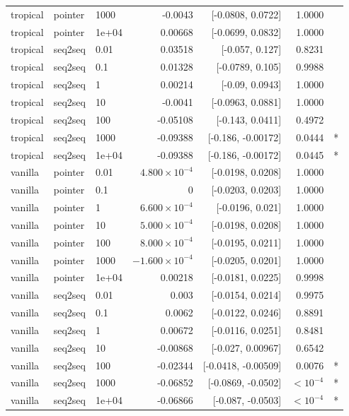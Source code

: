 \documentclass[10pt]{article}
\begin{document}
{\begin{longtable}{lllrrrl}
tropical & pointer & 1000 & -0.0043 & [-0.0808, 0.0722] & 1.0000 & \\
tropical & pointer & 1e+04 & 0.00668 & [-0.0699, 0.0832] & 1.0000 & \\
tropical & seq2seq & 0.01 & 0.03518 & [-0.057, 0.127] & 0.8231 & \\
tropical & seq2seq & 0.1 & 0.01328 & [-0.0789, 0.105] & 0.9988 & \\
tropical & seq2seq & 1 & 0.00214 & [-0.09, 0.0943] & 1.0000 & \\
tropical & seq2seq & 10 & -0.0041 & [-0.0963, 0.0881] & 1.0000 & \\
tropical & seq2seq & 100 & -0.05108 & [-0.143, 0.0411] & 0.4972 & \\
tropical & seq2seq & 1000 & -0.09388 & [-0.186, -0.00172] & 0.0444 & *\\
tropical & seq2seq & 1e+04 & -0.09388 & [-0.186, -0.00172] & 0.0445 & *\\
vanilla & pointer & 0.01 & $4.800\times10^{-4}$ & [-0.0198, 0.0208] & 1.0000 & \\
vanilla & pointer & 0.1 & 0 & [-0.0203, 0.0203] & 1.0000 & \\
vanilla & pointer & 1 & $6.600\times10^{-4}$ & [-0.0196, 0.021] & 1.0000 & \\
vanilla & pointer & 10 & $5.000\times10^{-4}$ & [-0.0198, 0.0208] & 1.0000 & \\
vanilla & pointer & 100 & $8.000\times10^{-4}$ & [-0.0195, 0.0211] & 1.0000 & \\
vanilla & pointer & 1000 & $-1.600\times10^{-4}$ & [-0.0205, 0.0201] & 1.0000 & \\
vanilla & pointer & 1e+04 & 0.00218 & [-0.0181, 0.0225] & 0.9998 & \\
vanilla & seq2seq & 0.01 & 0.003 & [-0.0154, 0.0214] & 0.9975 & \\
vanilla & seq2seq & 0.1 & 0.0062 & [-0.0122, 0.0246] & 0.8891 & \\
vanilla & seq2seq & 1 & 0.00672 & [-0.0116, 0.0251] & 0.8481 & \\
vanilla & seq2seq & 10 & -0.00868 & [-0.027, 0.00967] & 0.6542 & \\
vanilla & seq2seq & 100 & -0.02344 & [-0.0418, -0.00509] & 0.0076 & *\\
vanilla & seq2seq & 1000 & -0.06852 & [-0.0869, -0.0502] & $<10^{-4}$ & *\\
vanilla & seq2seq & 1e+04 & -0.06866 & [-0.087, -0.0503] & $<10^{-4}$ & *\\
\bottomrule
\end{longtable}
}
\end{document}
